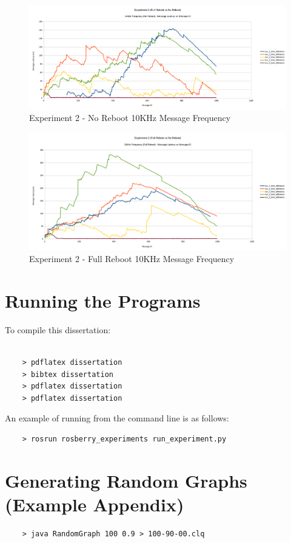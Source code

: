 \documentclass{l4proj}
\begin{document}
\begin{appendices}
\begin{figure}
\centering
\includegraphics[width=\textwidth]{images/no-reboot-10khz.png}
\caption{Experiment 2 - No Reboot 10KHz Message Frequency}
\label{exp2-noreboot-10khz}
\end{figure}

\begin{figure}
\centering
\includegraphics[width=\textwidth]{images/full-reboot-10khz.png}
\caption{Experiment 2 - Full Reboot 10KHz Message Frequency}
\label{exp2-fullreboot-10khz}
\end{figure}

\chapter{Running the Programs}

To compile this dissertation:
\begin{verbatim}

	> pdflatex dissertation
	> bibtex dissertation
	> pdflatex dissertation
    > pdflatex dissertation

\end{verbatim}


An example of running from the command line is as follows:
\begin{verbatim}
	> rosrun rosberry_experiments run_experiment.py
\end{verbatim}


\chapter{Generating Random Graphs (Example Appendix)}
\label{sec:randomGraph}

\begin{verbatim}
	> java RandomGraph 100 0.9 > 100-90-00.clq
\end{verbatim}
\end{appendices}




\end{document}
